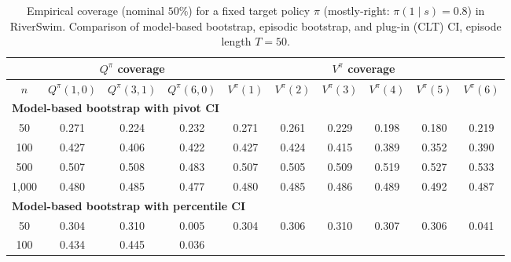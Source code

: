 \documentclass{article}
\numberwithin{equation}{section}
\begin{document}
\begin{table}[ht]
\centering
\caption{Empirical coverage (nominal $50\%$) for a fixed target policy $\pi$ (mostly-right: $\pi(1\mid s)=0.8$) in RiverSwim. Comparison of model-based bootstrap, episodic bootstrap, and plug-in (CLT) CI, episode length $T=50$.}
\label{tab:riverswim-mostly-right-coverage-50}
\begin{tabular}{c|ccc|cccccc}
\hline
& \multicolumn{3}{c|}{$Q^\pi$ coverage} & \multicolumn{6}{c}{$V^\pi$ coverage} \\ \hline
$n$
& $Q^\pi(1,0)$ & $Q^\pi(3,1)$ & $Q^\pi(6,0)$
& $V^\pi(1)$ & $V^\pi(2)$ & $V^\pi(3)$ & $V^\pi(4)$ & $V^\pi(5)$ & $V^\pi(6)$ \\
\hline
\multicolumn{10}{l}{\textbf{Model-based bootstrap with pivot CI}} \\ \hline
50
& 0.271 & 0.224 & 0.232
& 0.271 & 0.261 & 0.229 & 0.198 & 0.180 & 0.219 \\
100
& \cellcolor{covheat!64!white}0.427 & \cellcolor{covheat!53!white}0.406 & \cellcolor{covheat!61!white}0.422
& \cellcolor{covheat!64!white}0.427 & \cellcolor{covheat!62!white}0.424 & \cellcolor{covheat!57!white}0.415 & \cellcolor{covheat!45!white}0.389 & \cellcolor{covheat!26!white}0.352 & \cellcolor{covheat!45!white}0.390 \\
500
& \cellcolor{covheat!100!white}0.507 & \cellcolor{covheat!100!white}0.508 & \cellcolor{covheat!91!white}0.483
& \cellcolor{covheat!100!white}0.507 & \cellcolor{covheat!100!white}0.505 & \cellcolor{covheat!100!white}0.509 & \cellcolor{covheat!100!white}0.519 & \cellcolor{covheat!100!white}0.527 & \cellcolor{covheat!100!white}0.533 \\
1{,}000
& \cellcolor{covheat!90!white}0.480 & \cellcolor{covheat!92!white}0.485 & \cellcolor{covheat!88!white}0.477
& \cellcolor{covheat!90!white}0.480 & \cellcolor{covheat!92!white}0.485 & \cellcolor{covheat!93!white}0.486 & \cellcolor{covheat!94!white}0.489 & \cellcolor{covheat!96!white}0.492 & \cellcolor{covheat!94!white}0.487 \\
\hline
\multicolumn{10}{l}{\textbf{Model-based bootstrap with percentile CI}} \\ \hline
50
& \cellcolor{covheat!2!white}0.304 & \cellcolor{covheat!5!white}0.310 & 0.005
& \cellcolor{covheat!2!white}0.304 & \cellcolor{covheat!3!white}0.306 & \cellcolor{covheat!5!white}0.310 & \cellcolor{covheat!4!white}0.307 & \cellcolor{covheat!3!white}0.306 & 0.041 \\
100
& \cellcolor{covheat!67!white}0.434 & \cellcolor{covheat!73!white}0.445 & 0.036

\end{tabular}
\end{table}
\end{document}
